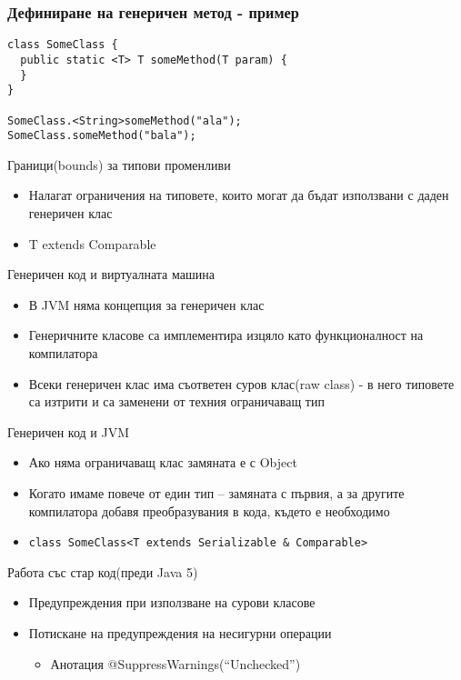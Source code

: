 \documentclass{beamer}
\begin{document}
\begin{frame}[fragile]
  \frametitle{Дефиниране на генеричен метод - пример}
  \transdissolve
\begin{lstlisting}
class SomeClass {
  public static <T> T someMethod(T param) {
  }
}

SomeClass.<String>someMethod("ala");
SomeClass.someMethod("bala");
\end{lstlisting}
\end{frame}

\begin{frame}{Граници(bounds) за типови променливи}
  \transdissolve
  \begin{itemize}
  \item Налагат ограничения на типовете, които могат да бъдат
    използвани с даден генеричен клас
  \item T extends Comparable
  \end{itemize}
\end{frame}

\begin{frame}{Генеричен код и виртуалната машина}
  \transdissolve
  \begin{itemize}
  \item В JVM няма концепция за генеричен клас
  \item Генеричните класове са имплементира изцяло като функционалност
    на компилатора
  \item Всеки генеричен клас има съответен суров клас(raw class) - в
    него типовете са изтрити и са заменени от техния ограничаващ тип
  \end{itemize}
\end{frame}

\begin{frame}{Генеричен код и JVM}
  \transdissolve
  \begin{itemize}
  \item Ако няма ограничаващ клас замяната е с Object
  \item Когато имаме повече от един тип –
    замяната с първия, а за другите
    компилатора добавя преобразувания в
    кода, където е необходимо
  \item \lstinline$class SomeClass<T extends Serializable & Comparable>$

  \end{itemize}
\end{frame}

\begin{frame}{Работа със стар код(преди Java 5)}
  \transdissolve
  \begin{itemize}
  \item Предупреждения при използване на сурови класове
  \item Потискане на предупреждения на несигурни операции
    \begin{itemize}
      \item Анотация @SuppressWarnings("`Unchecked"')
    \end{itemize}

  \end{itemize}
\end{frame}
\end{document}
